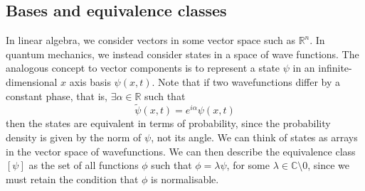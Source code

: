 \subsection{Bases and equivalence classes}
In linear algebra, we consider vectors in some vector space such as \( \mathbb R^n \).
In quantum mechanics, we instead consider states in a space of wave functions.
The analogous concept to vector components is to represent a state \( \psi \) in an infinite-dimensional \( x \) axis basis \( \psi(x,t) \).
Note that if two wavefunctions differ by a constant phase, that is, \( \exists \alpha \in \mathbb R \) such that
\[
	\widetilde \psi(x,t) = e^{i \alpha} \psi(x,t)
\]
then the states are equivalent in terms of probability, since the probability density is given by the norm of \( \psi \), not its angle.
We can think of states as arrays in the vector space of wavefunctions.
We can then describe the equivalence class \( [\psi] \) as the set of all functions \( \phi \) such that \( \phi = \lambda \psi \), for some \( \lambda \in \mathbb C \setminus \qty{0} \), since we must retain the condition that \( \phi \) is normalisable.

